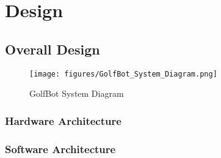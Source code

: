 \chapter{Design}
\label{chap:design}

\section{Overall Design}
\begin{figure}
    \centering
    \texttt{[image: figures/GolfBot\_System\_Diagram.png]}
    \caption{GolfBot System Diagram}
    \label{fig:golfbot_system_diagram}
\end{figure}

\subsection{Hardware Architecture}

\subsection{Software Architecture}
